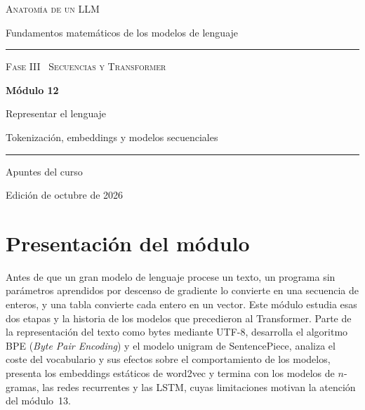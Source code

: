 \documentclass[11pt,a4paper,twoside,openany]{book}
\begin{document}
\frontmatter
\begin{titlepage}
\centering
\vspace*{2.5cm}
{\large\scshape Anatomía de un LLM}\par
\vspace{0.4cm}
{\normalsize Fundamentos matemáticos de los modelos de lenguaje}\par
\vspace{2.2cm}
\rule{\textwidth}{0.8pt}\par\vspace{0.5cm}
{\small\scshape Fase III \textperiodcentered\ Secuencias y Transformer}\par\vspace{0.3cm}
{\Huge\bfseries Módulo 12\par}\vspace{0.3cm}
{\LARGE Representar el lenguaje\par}
\vspace{0.2cm}
{\large Tokenización, embeddings y modelos secuenciales\par}
\vspace{0.5cm}\rule{\textwidth}{0.4pt}\par
\vspace{1.6cm}
{\large Apuntes del curso}\par
\vfill
{\small Edición de octubre de 2026}\par
\end{titlepage}

\chapter*{Presentación del módulo}

Antes de que un gran modelo de lenguaje procese un texto, un programa sin parámetros aprendidos por descenso de gradiente lo convierte en una secuencia de enteros, y una tabla convierte cada entero en un vector. Este módulo estudia esas dos etapas y la historia de los modelos que precedieron al Transformer. Parte de la representación del texto como bytes mediante UTF-8, desarrolla el algoritmo BPE (\emph{Byte Pair Encoding}) y el modelo unigram de SentencePiece, analiza el coste del vocabulario y sus efectos sobre el comportamiento de los modelos, presenta los embeddings estáticos de word2vec y termina con los modelos de $n$-gramas, las redes recurrentes y las LSTM, cuyas limitaciones motivan la atención del módulo~13.
\end{document}

